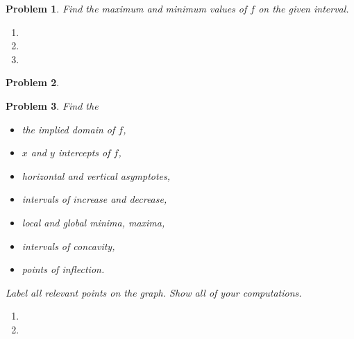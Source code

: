 \documentclass{article}
\renewcommand{\fcProblemRef}{\theproblem.\theenumi}
\newtheorem{problem}{Problem}
\begin{document}
\begin{problem}
Find the maximum and minimum values of $f$ on the given interval. 
\begin{multicols}{2}
\begin{enumerate}[ref={\fcProblemRef}]
\item 
\item 
\item 
\end{enumerate}
\end{multicols}
\end{problem}
\begin{problem}

\end{problem}

\begin{problem}
Find the
\begin{multicols}{2}
\begin{itemize}
\item the implied domain of $f$,
\item $x$ and $y$ intercepts of $f$,
\item horizontal and vertical asymptotes,
\item intervals of increase and decrease,
\item local and global minima, maxima,
\item intervals of concavity,
\item points of inflection.
\end{itemize}
\end{multicols}
Label all relevant points on the graph. Show all of your computations.
\begin{enumerate}[ref={\fcProblemRef}]
\item 
\item 
\end{enumerate}
\end{problem}

\end{document}
